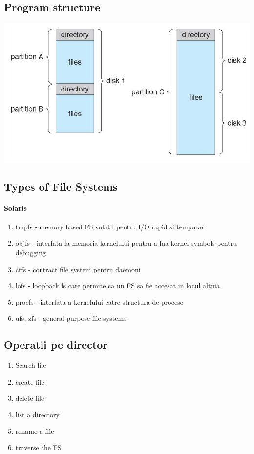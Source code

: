 \documentclass{article}
\begin{document}
\subsection*{Program structure}
\begin{center}
    \includegraphics[scale=0.4]{41-fsorg.png}
\end{center}

\subsection*{Types of File Systems}
\paragraph*{Solaris}
\begin{enumerate}
    \item tmpfs - memory based FS volatil pentru I/O rapid si temporar
    \item objfs - interfata la memoria kernelului pentru a lua kernel symbols pentru debugging
    \item ctfs - contract file system pentru daemoni
    \item lofs - loopback fs care permite ca un FS sa fie accesat in locul altuia
    \item procfs - interfata a kernelului catre structura de procese
    \item ufs, zfs - general purpose file systems
\end{enumerate}

\subsection*{Operatii pe director}
\begin{enumerate}
    \item Search file
    \item create file
    \item delete file
    \item list a directory
    \item rename a file
    \item traverse the FS
\end{enumerate}
\end{document}

